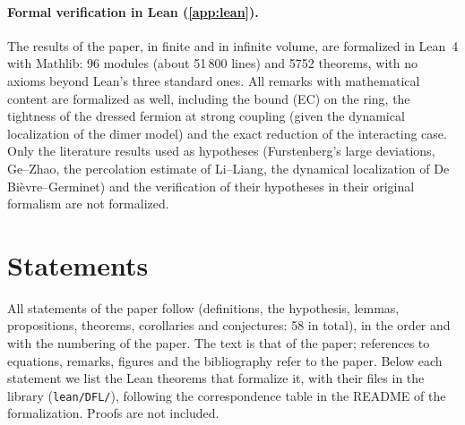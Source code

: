 \documentclass[11pt]{article}
\theoremstyle{stmtplain}
\theoremstyle{stmtdef}
\begin{document}
\paragraph{Formal verification in Lean (\cref{app:lean}).}
The results of the paper, in finite and in infinite volume, are formalized in Lean~4 with Mathlib: 96 modules (about
51\,800 lines) and 5752 theorems, with no axioms beyond Lean's three standard ones. All remarks with mathematical
content are formalized as well, including the bound (EC) on the ring, the tightness of the dressed fermion at
strong coupling (given the dynamical localization of the dimer model) and the exact reduction of the interacting case. Only the literature results used as hypotheses
(Furstenberg's large deviations, Ge--Zhao, the percolation estimate of Li--Liang, the dynamical localization of
De Bièvre--Germinet) and the verification of their hypotheses in their original formalism are not formalized.

\clearpage
\section{Statements}\label{sec:statements}

\noindent All statements of the paper follow (definitions, the hypothesis, lemmas, propositions, theorems,
corollaries and conjectures: 58 in total), in the order and with the numbering of the paper. The text is that of the
paper; references to equations, remarks, figures and the bibliography refer to the paper. Below each statement we
list the Lean theorems that formalize it, with their files in the library (\texttt{lean/DFL/}), following the
correspondence table in the README of the formalization. Proofs are not included.


\end{document}
